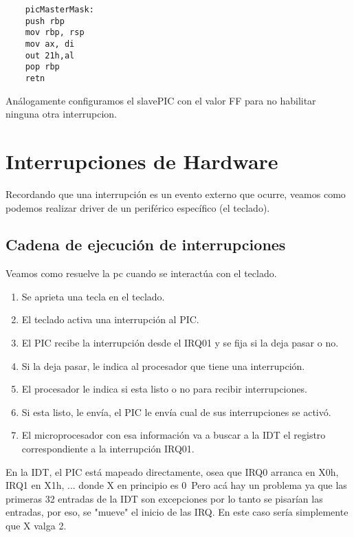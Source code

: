 \documentclass[]{article}
\begin{document}
\begin{verbatim}
	picMasterMask:
	push rbp
	mov rbp, rsp
	mov ax, di
	out	21h,al
	pop rbp
	retn
\end{verbatim}

Análogamente configuramos el slavePIC con el valor FF para no habilitar ninguna
otra interrupcion.

\section*{Interrupciones de Hardware}

Recordando que una interrupci\'on es un evento externo que ocurre, veamos como podemos
realizar driver de un periférico específico (el teclado).

\subsection*{Cadena de ejecuci\'on de interrupciones}
Veamos como resuelve la pc cuando se interact\'ua con el teclado.

\begin{center}
	\begin{enumerate}
		\item Se aprieta una tecla en el teclado.
		\item El teclado activa una interrupci\'on al PIC.
		\item El PIC recibe la interrupci\'on desde el IRQ01 y se
		fija si la deja pasar o no.
		\item Si la deja pasar, le indica al procesador que tiene una interrupci\'on.
		\item El procesador le indica si esta listo o no para recibir interrupciones.
		\item Si esta listo, le env\'ia, el PIC le env\'ia cual de sus interrupciones se activ\'o.
		\item El microprocesador con esa informaci\'on va a buscar a la IDT el registro correspondiente a la interrupci\'on IRQ01.
	\end{enumerate}
\end{center}

En la IDT, el PIC est\'a mapeado directamente, osea que IRQ0 arranca en X0h, IRQ1 en X1h, ... donde X en principio es 0\
Pero acá hay un problema ya que las primeras 32 entradas de la IDT son excepciones
por lo tanto se pisar\'ian las entradas, por eso, se "mueve" el inicio de las IRQ.
En este caso ser\'ia simplemente que X valga 2.\\
\end{document}
